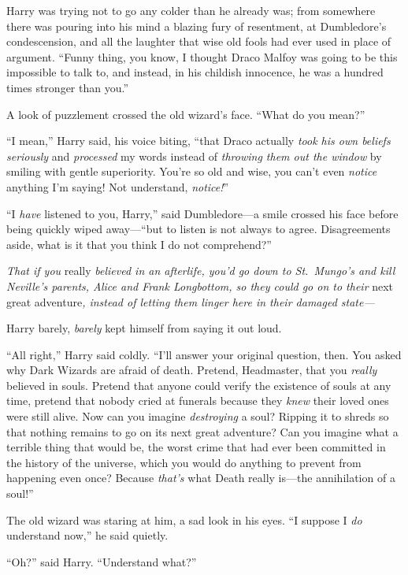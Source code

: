Harry was trying not to go any colder than he already was; from somewhere there was pouring into his mind a blazing fury of resentment, at Dumbledore’s condescension, and all the laughter that wise old fools had ever used in place of argument. “Funny thing, you know, I thought Draco Malfoy was going to be this impossible to talk to, and instead, in his childish innocence, he was a hundred times stronger than you.”

A look of puzzlement crossed the old wizard’s face. “What do you mean?”

“I mean,” Harry said, his voice biting, “that Draco actually \emph{took his own beliefs seriously} and \emph{processed} my words instead of \emph{throwing them out the window} by smiling with gentle superiority. You’re so old and wise, you can’t even \emph{notice} anything I’m saying! Not understand, \emph{notice!}”

“I \emph{have} listened to you, Harry,” said Dumbledore—a smile crossed his face before being quickly wiped away—“but to listen is not always to agree. Disagreements aside, what is it that you think I do not comprehend?”

\emph{That if you} really\emph{ believed in an afterlife, you’d go down to St.~Mungo’s and kill Neville’s parents, Alice and Frank Longbottom, so they could go on to their} next great adventure\emph{, instead of letting them linger here in their damaged state—}

Harry barely, \emph{barely} kept himself from saying it out loud.

“All right,” Harry said coldly. “I’ll answer your original question, then. You asked why Dark Wizards are afraid of death. Pretend, Headmaster, that you \emph{really} believed in souls. Pretend that anyone could verify the existence of souls at any time, pretend that nobody cried at funerals because they \emph{knew} their loved ones were still alive. Now can you imagine \emph{destroying} a soul? Ripping it to shreds so that nothing remains to go on its next great adventure? Can you imagine what a terrible thing that would be, the worst crime that had ever been committed in the history of the universe, which you would do anything to prevent from happening even once? Because \emph{that’s} what Death really is—the annihilation of a soul!”

The old wizard was staring at him, a sad look in his eyes. “I suppose I \emph{do} understand now,” he said quietly.

“Oh?” said Harry. “Understand what?”

